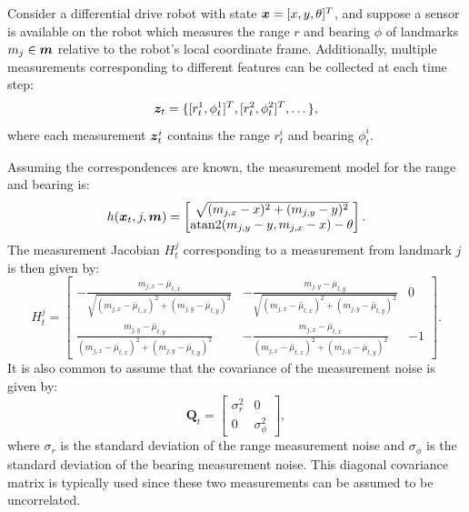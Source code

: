 \begin{example} \label{ex:rangeandbearing}
\theoremstyle{definition}
Consider a differential drive robot with state $\bm{x} = [x, y, \theta]^T$, and suppose a sensor is available on the robot which measures the range $r$ and bearing $\phi$ of landmarks $m_j \in \bm{m}$ relative to the robot’s local coordinate frame. Additionally, multiple measurements corresponding to different features can be collected at each time step:
\begin{equation*}
\bm{z}_t = \{[r_t^1,\phi_t^1]^T, [r_t^2,\phi_t^2]^T, \dots\},
\end{equation*}
where each measurement $\bm{z}_t^i$ contains the range $r_t^i$ and bearing $\phi_t^i$. 

Assuming the correspondences are known, the measurement model for the range and bearing is:
\begin{equation}
h(\bm{x}_t, j, \bm{m})  = \begin{bmatrix}
\sqrt{(m_{j,x} - x)^{2} + (m_{j,y}- y)^{2}} \\
\text{atan2}(m_{j,y}- y, m_{j,x} - x) - \theta
\end{bmatrix}.
\end{equation}
The measurement Jacobian $H^j_t$ corresponding to a measurement from landmark $j$ is then given by:
\begin{equation}
H^j_t = \begin{bmatrix}
-\frac{m_{j,x} - \bar{\mu}_{t,x}}{\sqrt{(m_{j,x} - \bar{\mu}_{t,x})^2 + (m_{j,y} - \bar{\mu}_{t,y})^2}} & -\frac{m_{j,y} - \bar{\mu}_{t,y}}{\sqrt{(m_{j,x} - \bar{\mu}_{t,x})^2 + (m_{j,y} - \bar{\mu}_{t,y})^2}} & 0 \\
\frac{m_{j,y} - \bar{\mu}_{t,y}}{(m_{j,x} - \bar{\mu}_{t,x})^2 + (m_{j,y} - \bar{\mu}_{t,y})^2} & -\frac{m_{j,x} - \bar{\mu}_{t,x}}{(m_{j,x} - \bar{\mu}_{t,x})^2 + (m_{j,y} - \bar{\mu}_{t,y})^2} & -1
\end{bmatrix}.
\end{equation}
It is also common to assume that the covariance of the measurement noise is given by:
\begin{equation*}
\bm{Q}_t = \begin{bmatrix}
\sigma_r^2 & 0 \\ 0 & \sigma_\phi^2
\end{bmatrix},
\end{equation*}
where $\sigma_r$ is the standard deviation of the range measurement noise and $\sigma_\phi$ is the standard deviation of the bearing measurement noise. This diagonal covariance matrix is typically used since these two measurements can be assumed to be uncorrelated.
\end{example}


